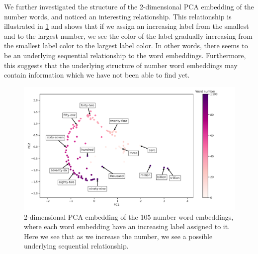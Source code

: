 We further investigated the structure of the 2-dimensional PCA embedding of the number words, and noticed an interesting relationship. This relationship is illustrated in \cref{fig:ordered-number-word-embeddings-2d-pca} and shows that if we assign an increasing label from the smallest and to the largest number, we see the color of the label gradually increasing from the smallest label color to the largest label color. In other words, there seems to be an underlying sequential relationship to the word embeddings. Furthermore, this suggests that the underlying structure of number word embeddings may contain information which we have not been able to find yet.
\begin{figure}[H]
    \centering
    \includegraphics[width=\textwidth]{thesis/figures/ordered-number-word-embeddings-2d-pca.pdf}
    \caption{2-dimensional PCA embedding of the 105 number word embeddings, where each word embedding have an increasing label assigned to it. Here we see that as we increase the number, we see a possible underlying sequential relationship.}
    \label{fig:ordered-number-word-embeddings-2d-pca}
\end{figure}
